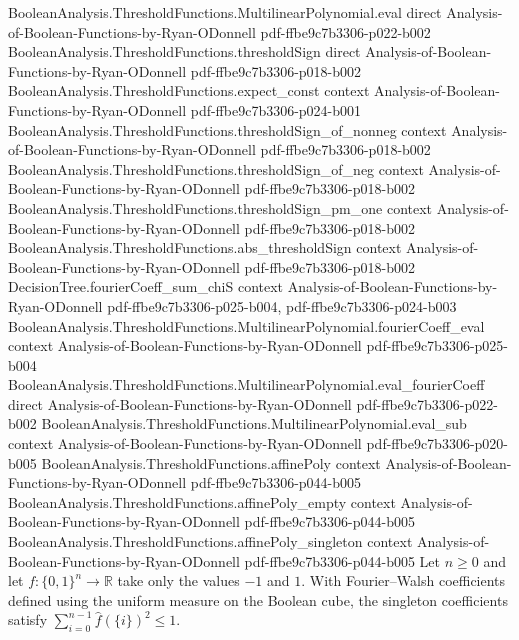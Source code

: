 \begin{lemma}
\proofstep
  {BooleanAnalysis.ThresholdFunctions.MultilinearPolynomial.eval}
  {direct}
  {Analysis-of-Boolean-Functions-by-Ryan-ODonnell}
  {pdf-ffbe9c7b3306-p022-b002}
\proofstep
  {BooleanAnalysis.ThresholdFunctions.thresholdSign}
  {direct}
  {Analysis-of-Boolean-Functions-by-Ryan-ODonnell}
  {pdf-ffbe9c7b3306-p018-b002}
\proofstep
  {BooleanAnalysis.ThresholdFunctions.expect_const}
  {context}
  {Analysis-of-Boolean-Functions-by-Ryan-ODonnell}
  {pdf-ffbe9c7b3306-p024-b001}
\proofstep
  {BooleanAnalysis.ThresholdFunctions.thresholdSign_of_nonneg}
  {context}
  {Analysis-of-Boolean-Functions-by-Ryan-ODonnell}
  {pdf-ffbe9c7b3306-p018-b002}
\proofstep
  {BooleanAnalysis.ThresholdFunctions.thresholdSign_of_neg}
  {context}
  {Analysis-of-Boolean-Functions-by-Ryan-ODonnell}
  {pdf-ffbe9c7b3306-p018-b002}
\proofstep
  {BooleanAnalysis.ThresholdFunctions.thresholdSign_pm_one}
  {context}
  {Analysis-of-Boolean-Functions-by-Ryan-ODonnell}
  {pdf-ffbe9c7b3306-p018-b002}
\proofstep
  {BooleanAnalysis.ThresholdFunctions.abs_thresholdSign}
  {context}
  {Analysis-of-Boolean-Functions-by-Ryan-ODonnell}
  {pdf-ffbe9c7b3306-p018-b002}
\proofstep
  {DecisionTree.fourierCoeff_sum_chiS}
  {context}
  {Analysis-of-Boolean-Functions-by-Ryan-ODonnell}
  {pdf-ffbe9c7b3306-p025-b004,
    pdf-ffbe9c7b3306-p024-b003}
\proofstep
  {BooleanAnalysis.ThresholdFunctions.MultilinearPolynomial.fourierCoeff_eval}
  {context}
  {Analysis-of-Boolean-Functions-by-Ryan-ODonnell}
  {pdf-ffbe9c7b3306-p025-b004}
\proofstep
  {BooleanAnalysis.ThresholdFunctions.MultilinearPolynomial.eval_fourierCoeff}
  {direct}
  {Analysis-of-Boolean-Functions-by-Ryan-ODonnell}
  {pdf-ffbe9c7b3306-p022-b002}
\proofstep
  {BooleanAnalysis.ThresholdFunctions.MultilinearPolynomial.eval_sub}
  {context}
  {Analysis-of-Boolean-Functions-by-Ryan-ODonnell}
  {pdf-ffbe9c7b3306-p020-b005}
\proofstep
  {BooleanAnalysis.ThresholdFunctions.affinePoly}
  {context}
  {Analysis-of-Boolean-Functions-by-Ryan-ODonnell}
  {pdf-ffbe9c7b3306-p044-b005}
\proofstep
  {BooleanAnalysis.ThresholdFunctions.affinePoly_empty}
  {context}
  {Analysis-of-Boolean-Functions-by-Ryan-ODonnell}
  {pdf-ffbe9c7b3306-p044-b005}
\proofstep
  {BooleanAnalysis.ThresholdFunctions.affinePoly_singleton}
  {context}
  {Analysis-of-Boolean-Functions-by-Ryan-ODonnell}
  {pdf-ffbe9c7b3306-p044-b005}
Let $n\ge 0$ and let $f:\{0,1\}^n\to\mathbb R$ take only the values $-1$ and $1$. With
Fourier–Walsh coefficients defined using the uniform measure on the Boolean cube, the
singleton coefficients satisfy $\sum_{i=0}^{n-1}\widehat f(\{i\})^2\le1$.
\end{lemma}

